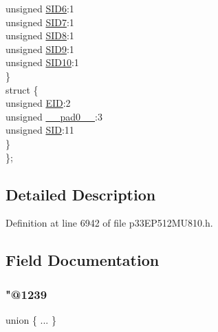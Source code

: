 \begin{DoxyCompactItemize}
\begin{tabbing}
\>\>unsigned \hyperlink{structtag_c2_r_x_f13_s_i_d_b_i_t_s_a70d70952133eb2389d5c326f9f0e8035}{SID6}:1\\
\>\>unsigned \hyperlink{structtag_c2_r_x_f13_s_i_d_b_i_t_s_a34097fb76decd431701fa2d86a22328e}{SID7}:1\\
\>\>unsigned \hyperlink{structtag_c2_r_x_f13_s_i_d_b_i_t_s_afe74894633244fdb0b0c01b4e8c522e7}{SID8}:1\\
\>\>unsigned \hyperlink{structtag_c2_r_x_f13_s_i_d_b_i_t_s_a33587704948067005c2a6a3ccc503c99}{SID9}:1\\
\>\>unsigned \hyperlink{structtag_c2_r_x_f13_s_i_d_b_i_t_s_a1a9084031c7f5fb16007feeebf0d8216}{SID10}:1\\
\>\} \\
\>struct \{\\
\>\>unsigned \hyperlink{structtag_c2_r_x_f13_s_i_d_b_i_t_s_ae80b378c9141f7c03e0b4e55b5f4b54d}{EID}:2\\
\>\>unsigned \hyperlink{structtag_c2_r_x_f13_s_i_d_b_i_t_s_adf71f3d8410c1f1dbbc96680a92c49af}{\_\_pad0\_\_}:3\\
\>\>unsigned \hyperlink{structtag_c2_r_x_f13_s_i_d_b_i_t_s_af88edf93b2fee2432665bd84f51287e4}{SID}:11\\
\>\} \\
\}; \\

\end{tabbing}\end{DoxyCompactItemize}


\subsection{Detailed Description}


Definition at line 6942 of file p33\+E\+P512\+M\+U810.\+h.



\subsection{Field Documentation}
\mbox{\label{structtag_c2_r_x_f13_s_i_d_b_i_t_s_a94582a23c287b1ba166498d0cdd07123}} 
\subsubsection{\texorpdfstring{"@1239}{@1239}}
{\footnotesize\ttfamily union \{ ... \} }

\mbox{\label{structtag_c2_r_x_f13_s_i_d_b_i_t_s_adf71f3d8410c1f1dbbc96680a92c49af}} 
